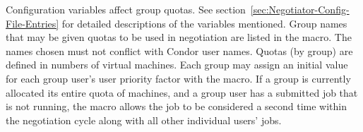 Configuration variables affect group quotas.
See section~\ref{sec:Negotiator-Config-File-Entries} for detailed
descriptions of the variables mentioned.
Group names that may be given quotas to be used in
negotiation are listed in the  macro.
The names chosen must not conflict with Condor user names.
Quotas (by group) are defined in numbers of virtual machines.
Each group may assign an initial value for each group user's
user priority factor with the 
macro.
If a group is currently allocated its entire quota of machines,
and a group user has a submitted job that is not running,
the  macro allows the job to be
considered a second time within the negotiation cycle
along with all other individual users' jobs.




